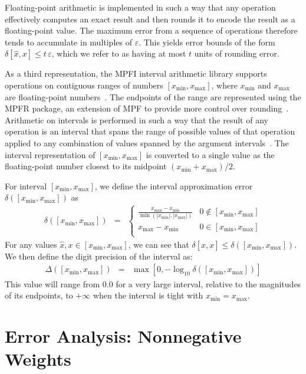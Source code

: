 \documentclass[letterpaper,USenglish,cleveref, autoref, thm-restate]{lipics-v2021}
\newcommand{\approximate}[1]{\hat{#1}}
\newcommand{\approxx}{\approximate{x}}
\newcommand{\aerror}{\delta}
\newcommand{\digitprecision}{\Delta}
\newcommand{\roundepsilon}{\varepsilon}
\newcommand{\xmin}{x_{\textrm{min}}}
\newcommand{\xmax}{x_{\textrm{max}}}
\begin{document}
Floating-point arithmetic is implemented in such a way that any
operation effectively computes an exact result and then rounds it to
encode the result as a floating-point value.  The maximum error from a sequence of operations
therefore tends to accumulate in multiples of $\roundepsilon$.
This yields error bounds of the form $\aerror[\approxx, x] \leq t\,\roundepsilon$,
which we  refer to as having at most $t$ units of
rounding error.

As a third representation, the MPFI interval arithmetic library
supports operations on
contiguous ranges of numbers $[\xmin, \xmax]$, where
$\xmin$ and $\xmax$ are floating-point numbers~\cite{revol:rc:2005}.  The endpoints of the
range are represented using the MPFR package, an extension of MPF to
provide more control over rounding~\cite{fousse:tms:2007}.  Arithmetic on intervals is performed
in such a way that the result of any operation is an interval that
spans the range of possible values of that operation applied to any
combination of values spanned by the argument intervals~\cite{hickey:jacm:2001}.  The interval representation of $[\xmin, \xmax]$ is converted to
a single value as
the floating-point number closest to its midpoint $(\xmin + \xmax)/2$.

For interval $[\xmin, \xmax]$, we define the interval approximation error $\aerror([\xmin, \xmax])$ as
\begin{eqnarray}
\aerror([\xmin, \xmax]) & = & \left\{ \begin{array}{ll}
  \frac{\xmax - \xmin}{\min(|\xmin|, |\xmax|)}  & 0 \not \in [\xmin, \xmax]\\[0.8em]
  \xmax - \xmin &  0 \in [\xmin, \xmax]\\
  \end{array} \right. \label{eqn:interval:error}
\end{eqnarray}
For any values $\approxx, x \in [\xmin, \xmax]$, we can see that
$\aerror[\approxx, x] \leq \aerror([\xmin, \xmax])$.
We then define the digit precision of the interval as:
\begin{eqnarray}
\digitprecision([\xmin, \xmax]) & = & \max[0, -\log_{10} \aerror([\xmin, \xmax])] \label{eqn:interval:digitprecision} 
\end{eqnarray}
This value will range from $0.0$ for a very large interval, relative to the magnitudes of its endpoints, to $+\infty$ when the interval is tight with $\xmin = \xmax$.

\section{Error Analysis: Nonnegative Weights}
\label{sect:nonneg}
\end{document}
